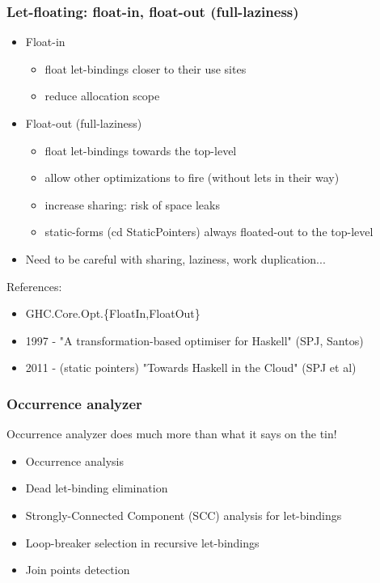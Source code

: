 \documentclass[aspectratio=169]{beamer}
\begin{document}
\begin{frame}
  \frametitle{Let-floating: float-in, float-out (full-laziness)}

  \begin{itemize}
    \item Float-in
      \begin{itemize}
        \item float let-bindings closer to their use sites
        \item reduce allocation scope
      \end{itemize}
    \item Float-out (full-laziness)
      \begin{itemize}
        \item float let-bindings towards the top-level
        \item allow other optimizations to fire (without lets in their way)
        \item increase sharing: risk of space leaks
        \item static-forms (cd StaticPointers) always floated-out to the top-level
      \end{itemize}
    \item Need to be careful with sharing, laziness, work duplication...
  \end{itemize}

  References:
  \begin{itemize}
    \item GHC.Core.Opt.\{FloatIn,FloatOut\}
    \item 1997 - "A transformation-based optimiser for Haskell" (SPJ, Santos)
    \item 2011 - (static pointers) "Towards Haskell in the Cloud" (SPJ et al)
  \end{itemize}
\end{frame}

\begin{frame}
  \frametitle{Occurrence analyzer}

  Occurrence analyzer does much more than what it says on the tin!

  \begin{itemize}
    \item Occurrence analysis
    \item Dead let-binding elimination
    \item Strongly-Connected Component (SCC) analysis for let-bindings
    \item Loop-breaker selection in recursive let-bindings
    \item Join points detection
  \end{itemize}
\end{frame}
\end{document}
